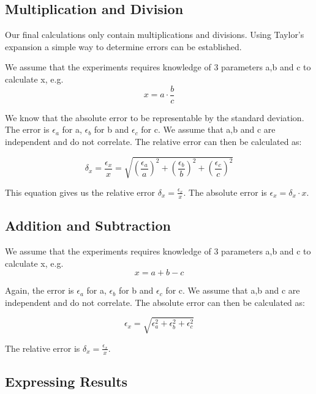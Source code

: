 \documentclass[
10pt, %
a4paper, %
oneside, %
headinclude,footinclude, %
BCOR5mm, %
]{scrartcl}
\begin{document}
\subsection{Multiplication and Division}
Our final calculations only contain multiplications and divisions. Using Taylor's expansion a simple way to determine errors can be established.

We assume that the experiments requires knowledge of $3$ parameters a,b and c to calculate x, e.g.
\begin{equation}
x=a\cdot \frac{b}{c}
\end{equation} 

We know that the absolute error to be representable by the standard deviation. The error is $\epsilon_a$ for a, $\epsilon_b$ for b and $\epsilon_c$ for c. We assume that a,b and c are independent and do not correlate. The relative error can then be calculated as:

\begin{equation}
\delta_x=\frac{\epsilon_x}{x}= \sqrt{(\frac{\epsilon_a}{a})^2+(\frac{\epsilon_b}{b})^2+(\frac{\epsilon_c}{c})^2}
\end{equation}

This equation gives us the relative error $\delta_x=\frac{\epsilon_x}{x}$. The absolute error is $\epsilon_x=\delta_x \cdot x$.

\subsection{Addition and Subtraction}
We assume that the experiments requires knowledge of $3$ parameters a,b and c to calculate x, e.g.
\begin{equation}
x=a+ b -c
\end{equation} 

 Again, the error is $\epsilon_a$ for a, $\epsilon_b$ for b and $\epsilon_c$ for c. We assume that a,b and c are independent and do not correlate. The absolute error can then be calculated as:

\begin{equation}
\epsilon_x= \sqrt{\epsilon_a^2+\epsilon_b^2+\epsilon_c^2}
\end{equation}

The relative error is $\delta_x=\frac{\epsilon_x}{x}$.

\subsection{Expressing Results}
\end{document}
